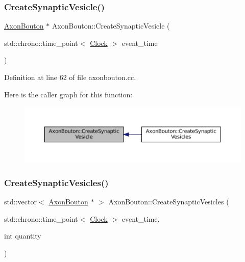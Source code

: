 \subsubsection{\texorpdfstring{Create\+Synaptic\+Vesicle()}{CreateSynapticVesicle()}}
{\footnotesize\ttfamily \mbox{\hyperlink{class_axon_bouton}{Axon\+Bouton}} $\ast$ Axon\+Bouton\+::\+Create\+Synaptic\+Vesicle (\begin{DoxyParamCaption}\item[{std\+::chrono\+::time\+\_\+point$<$ \mbox{\hyperlink{universe_8h_a0ef8d951d1ca5ab3cfaf7ab4c7a6fd80}{Clock}} $>$}]{event\+\_\+time }\end{DoxyParamCaption})}



Definition at line 62 of file axonbouton.\+cc.

Here is the caller graph for this function\+:\nopagebreak
\begin{figure}[H]
\begin{center}
\leavevmode
\includegraphics[width=350pt]{class_axon_bouton_a2aa0abe381f6e7c87c702189d01dfbf2_icgraph}
\end{center}
\end{figure}
\mbox{\label{class_axon_bouton_a0cabe429536722f14ae800c8579168b7}} 
\subsubsection{\texorpdfstring{Create\+Synaptic\+Vesicles()}{CreateSynapticVesicles()}}
{\footnotesize\ttfamily std\+::vector$<$ \mbox{\hyperlink{class_axon_bouton}{Axon\+Bouton}} $\ast$ $>$ Axon\+Bouton\+::\+Create\+Synaptic\+Vesicles (\begin{DoxyParamCaption}\item[{std\+::chrono\+::time\+\_\+point$<$ \mbox{\hyperlink{universe_8h_a0ef8d951d1ca5ab3cfaf7ab4c7a6fd80}{Clock}} $>$}]{event\+\_\+time,  }\item[{int}]{quantity }\end{DoxyParamCaption})}



